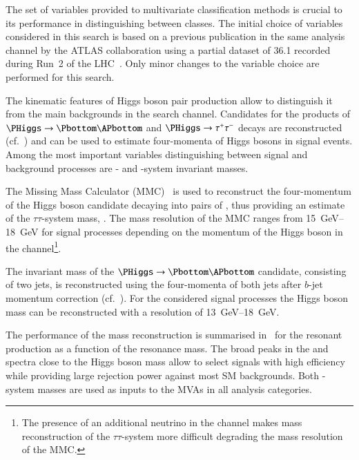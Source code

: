 The set of variables provided to multivariate classification methods
is crucial to its performance in distinguishing between classes. The
initial choice of variables considered in this search is based on a
previous publication in the same analysis channel by the ATLAS
collaboration using a partial dataset of \SI{36.1}{\ifb} recorded
during Run~2 of the LHC~\cite{HIGG-2016-16-witherratum}. Only minor
changes to the variable choice are performed for this search.

The kinematic features of Higgs boson pair production allow to
distinguish it from the main backgrounds in the \bbtautau search
channel. Candidates for the products of
$\PHiggs \ra \Pbottom\APbottom$ and $\PHiggs \ra \tautau$ decays are
reconstructed (cf.~) and
can be used to estimate four-momenta of Higgs bosons in signal
events. Among the most important variables distinguishing between
signal and background processes are \PHiggs- and \HH-system invariant
masses.

The Missing Mass Calculator (MMC)~\cite{Elagin:2010aw} is used to
reconstruct the four-momentum of the Higgs boson candidate decaying
into pairs of \tauleptons, thus providing an estimate of the
$\tau\tau$-system mass, \mMMC. The mass resolution of the MMC ranges
from \SIrange{15}{18}{\GeV} for signal processes depending on the
momentum of the Higgs boson in the \hadhad channel\footnote{The
  presence of an additional neutrino in the \lephad channel makes mass
  reconstruction of the $\tau\tau$-system more difficult degrading the
  mass resolution of the MMC.}.

The invariant mass of the $\PHiggs \ra \Pbottom\APbottom$ candidate,
consisting of two \btagged jets, is reconstructed using the
four-momenta of both jets after $b$-jet momentum correction
(cf.~). For the considered signal
processes the Higgs boson mass can be reconstructed with a resolution
of \SIrange{13}{18}{\GeV}.

The performance of the \PHiggs mass reconstruction is summarised
in~ for the resonant production \HH as
a function of the resonance mass. The broad peaks in the \mMMC and
\mBB spectra close to the Higgs boson mass allow to select signals
with high efficiency while providing large rejection power against
most SM backgrounds. Both \PHiggs-system masses are used as inputs to
the MVAs in all analysis categories.

